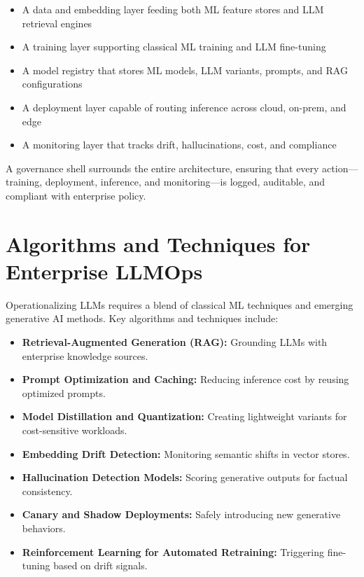 \documentclass[11pt]{article}
\begin{document}
\begin{itemize}[leftmargin=1.2cm]
    \item A data and embedding layer feeding both ML feature stores and LLM retrieval engines
    \item A training layer supporting classical ML training and LLM fine-tuning
    \item A model registry that stores ML models, LLM variants, prompts, and RAG configurations
    \item A deployment layer capable of routing inference across cloud, on-prem, and edge
    \item A monitoring layer that tracks drift, hallucinations, cost, and compliance
\end{itemize}



A governance shell surrounds the entire architecture, ensuring that every action—training, deployment, inference, and monitoring—is logged, auditable, and compliant with enterprise policy.

\section{Algorithms and Techniques for Enterprise LLMOps}

Operationalizing LLMs requires a blend of classical ML techniques and emerging generative AI methods. Key algorithms and techniques include:

\begin{itemize}[leftmargin=1.2cm]
    \item \textbf{Retrieval-Augmented Generation (RAG):} Grounding LLMs with enterprise knowledge sources.
    \item \textbf{Prompt Optimization and Caching:} Reducing inference cost by reusing optimized prompts.
    \item \textbf{Model Distillation and Quantization:} Creating lightweight variants for cost-sensitive workloads.
    \item \textbf{Embedding Drift Detection:} Monitoring semantic shifts in vector stores.
    \item \textbf{Hallucination Detection Models:} Scoring generative outputs for factual consistency.
    \item \textbf{Canary and Shadow Deployments:} Safely introducing new generative behaviors.
    \item \textbf{Reinforcement Learning for Automated Retraining:} Triggering fine-tuning based on drift signals.
\end{itemize}
\end{document}
